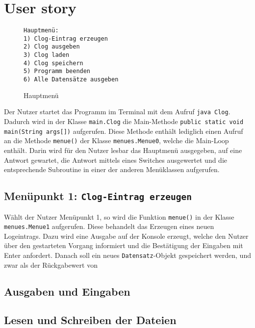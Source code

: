\documentclass[oneside,12pt]{scrartcl}
\newcommand{\code}[1]{\textcolor{Firebrick4}{\bcode{#1}}}
\newcommand{\class}[1]{\textcolor{Green4}{\bcode{#1}}}
\newcommand{\bcode}[1]{\texttt{#1}}
\begin{document}
\section{User story}
\begin{wrapfigure}{r}{0.4\textwidth}
\vspace{-10pt}
\begin{verbatim}
Hauptmenü:
1) Clog-Eintrag erzeugen
2) Clog ausgeben
3) Clog laden
4) Clog speichern
5) Programm beenden
6) Alle Datensätze ausgeben
\end{verbatim}
\vspace{-10pt}
\caption{Hauptmenü}
\end{wrapfigure}
Der Nutzer startet das Programm im Terminal mit dem Aufruf \code{java Clog}. Dadurch wird in der Klasse \code{main.Clog} die Main-Methode \code{public static void main(String args[])} aufgerufen. Diese Methode enthält lediglich einen Aufruf an die Methode \code{menue()} der Klasse \code{menues.Menue0}, welche die Main-Loop enthält. Darin wird für den Nutzer lesbar das Hauptmenü ausgegeben, auf eine Antwort gewartet, die Antwort mittels eines Switches ausgewertet und die entsprechende Subroutine in einer der anderen Menüklassen aufgerufen. 

\subsection{Menüpunkt 1: \code{Clog-Eintrag erzeugen}}
Wählt der Nutzer Menüpunkt 1, so wird die Funktion \code{menue()} in der Klasse \code{menues.Menue1} aufgerufen. Diese behandelt das Erzeugen eines neuen Logeintrags. Dazu wird eine Ausgabe auf der Konsole erzeugt, welche den Nutzer über den gestarteten Vorgang informiert und die Bestätigung der Eingaben mit Enter anfordert. Danach soll ein neues \class{Datensatz}-Objekt gespeichert werden, und zwar als der Rückgabewert von

\subsection{Ausgaben und Eingaben}

\subsection{Lesen und Schreiben der Dateien}
\end{document}
